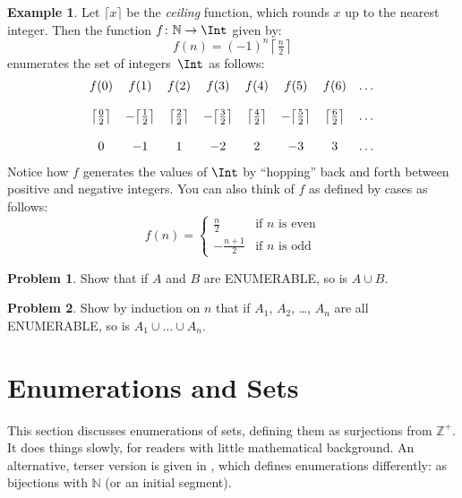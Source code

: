 \documentclass[10pt,a4paper]{article}
\makeatletter
\newcommand*{\olup}[1]{\MakeUppercase{#1}}
\theoremstyle{plain}
\theoremstyle{definition}
\newtheorem{ex}[thm]{Example}
\newtheorem{prob}{Problem}[section]
\theoremstyle{remark}
\newenvironment{editorial}{}{}
\newcommand*{\olfileid}[3]{}
\newcommand*{\olsection}[1]{\section*{#1}}
\newcommand{\olref}{\@ifnextchar[{\olref@i}{\olref@final}}
\def\olref@i[#1]{\@ifnextchar[{\olref@ii}{\olref@final}}
\def\olref@ii[#1]{\@ifnextchar[{\olref@iii}{\olref@final}}
\def\olref@iii[#1]{\olref@final}
\def\olref@final#1{\ref{#1}}
\providecommand{\Nat}{\ensuremath{\mathbb{N}}}
\providecommand{\PosInt}{\mathbb{Z}^{+}}
\makeatother
\begin{document}
\begin{ex}
Let $\lceil x \rceil$ be the \emph{ceiling} function, which rounds $x$
up to the nearest integer. Then the function $f \colon \Nat \to \Int$
given by:
\[
  f(n) = (-1)^{n} \left\lceil\tfrac{n}{2}\right\rceil
\]
enumerates the set of
integers~$\Int$ as follows:
\[
\begin{array}{c c c c c c c c}
f(0) & f(1) & f(2) & f(3) & f(4) & f(5) & f(6) & \dots \\ \\
\big\lceil \tfrac{0}{2} \big\rceil & -\big\lceil \tfrac{1}{2}\big\rceil &  \big\lceil \tfrac{2}{2} \big\rceil & -\big\lceil \tfrac{3}{2} \big\rceil & \big\lceil \tfrac{4}{2} \big\rceil  & -\big\lceil \tfrac{5}{2}\big\rceil & \big\lceil \tfrac{6}{2} \big\rceil & \dots \\ \\
0 & -1 & 1 & -2 & 2 & -3 & 3& \dots
\end{array}
\]
Notice how $f$ generates the values of $\Int$ by ``hopping'' back and
forth between positive and negative integers. You can also think of
$f$ as defined by cases as follows:
\[
f(n) = \begin{cases}
  \frac{n}{2} & \text{if $n$ is even}\\
  -\frac{n+1}{2} & \text{if $n$ is odd}
  \end{cases}
\]
\end{ex}

\begin{prob}
Show that if $A$ and $B$ are \olup{enumerable}, so is $A \cup B$.
\end{prob}

\begin{prob}
Show by induction on $n$ that if $A_1$, $A_2$, \dots, $A_n$ are all
\olup{enumerable}, so is $A_1 \cup \dots \cup A_n$.
\end{prob}




\olfileid{sfr}{siz}{enm}

\olsection{Enumerations and  Sets}

\begin{editorial}
  This section discusses enumerations of sets, defining them as
  surjections from $\PosInt$. It does things slowly, for readers with
  little mathematical background. An alternative, terser
  version is given in \olref[enm-alt]{sec}, which defines enumerations
  differently: as bijections with $\Nat$ (or an initial segment).
\end{editorial}
\end{document}
